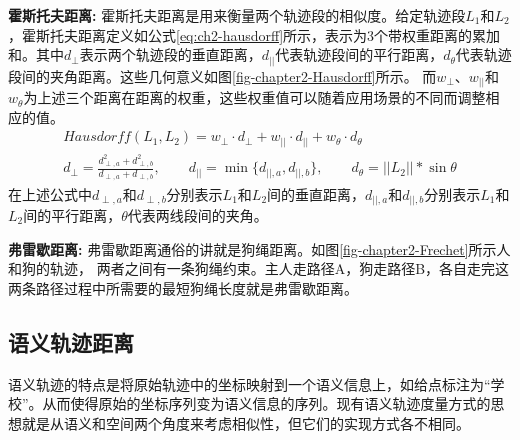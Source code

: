 \textbf{霍斯托夫距离:}
霍斯托夫距离是用来衡量两个轨迹段的相似度。给定轨迹段$L_{1}$和$L_{2}$，霍斯托夫距离定义如公式\ref{eq:ch2-hausdorff}所示，表示为3个带权重距离的累加和。其中$d_{\perp}$表示两个轨迹段的垂直距离，$d_{||}$代表轨迹段间的平行距离，$d_{\theta}$代表轨迹段间的夹角距离。这些几何意义如图\ref{fig-chapter2-Hausdorff}所示。
而$w_{\perp}$、$w_{||}$和$w_{\theta}$为上述三个距离在距离的权重，这些权重值可以随着应用场景的不同而调整相应的值。
\begin{eqnarray}\label{eq:ch2-hausdorff}
Hausdorff(L_{1},L_{2})=w_{\perp} \cdot d_{\perp} + w_{||}\cdot d_{||} +w_{\theta} \cdot d_{\theta} \nonumber \\
d_{\perp} =\frac{d_{\perp,a}^2 + d_{\perp,b} ^2}{d_{\perp,a} +d_{\perp,b}}, \qquad d_{||}=\min\{d_{||,a}, d_{||,b}\},\qquad d_{\theta}=||L_{2}||*\sin{\theta}
\end{eqnarray}
在上述公式中$d_{\perp,a}$和$d_{\perp,b}$分别表示$L_{1}$和$L_{2}$间的垂直距离，$d_{||,a}$和$d_{||,b}$分别表示$L_{1}$和$L_{2}$间的平行距离，$\theta$代表两线段间的夹角。


\textbf{弗雷歇距离:}
弗雷歇距离通俗的讲就是狗绳距离。如图\ref{fig-chapter2-Frechet}所示人和狗的轨迹， 两者之间有一条狗绳约束。主人走路径A，狗走路径B，各自走完这两条路径过程中所需要的最短狗绳长度就是弗雷歇距离。

\subsection{语义轨迹距离}
语义轨迹的特点是将原始轨迹中的坐标映射到一个语义信息上，如给点标注为“学校”。从而使得原始的坐标序列变为语义信息的序列。现有语义轨迹度量方式的思想就是从语义和空间两个角度来考虑相似性，但它们的实现方式各不相同。

